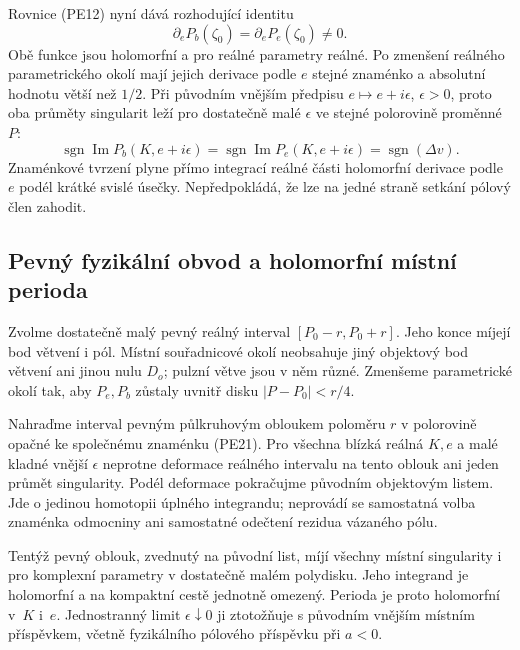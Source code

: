 \documentclass[11pt,a4paper]{article}
\theoremstyle{remark}\newtheorem{remark}[theorem]{Poznámka}
\numberwithin{equation}{section}
\begin{document}
Rovnice (PE12) nyní dává rozhodující identitu
\[
\boxed{
\partial_eP_b(\zeta_0)=\partial_eP_e(\zeta_0)\ne0.
}
\tag{PE20}
\]
Obě funkce jsou holomorfní a pro reálné parametry reálné.
Po zmenšení reálného parametrického okolí mají jejich derivace
podle \(e\) stejné znaménko a absolutní hodnotu větší než
\(1/2\). Při původním vnějším předpisu
\(e\mapsto e+i\epsilon\), \(\epsilon>0\), proto oba
průměty singularit leží pro dostatečně malé \(\epsilon\)
ve stejné polorovině proměnné \(P\):
\[
\operatorname{sgn}\operatorname{Im}P_b(K,e+i\epsilon)
=\operatorname{sgn}\operatorname{Im}P_e(K,e+i\epsilon)
=\operatorname{sgn}(\Delta v).
\tag{PE21}
\]
Znaménkové tvrzení plyne přímo integrací reálné části holomorfní
derivace podle \(e\) podél krátké svislé úsečky. Nepředpokládá,
že lze na jedné straně setkání pólový člen zahodit.

\subsection{Pevný fyzikální obvod a holomorfní místní perioda}

Zvolme dostatečně malý pevný reálný interval
\([P_0-r,P_0+r]\). Jeho konce míjejí bod větvení i pól.
Místní souřadnicové okolí neobsahuje jiný objektový bod větvení
ani jinou nulu \(D_o\); pulzní větve jsou v něm různé.
Zmenšeme parametrické okolí tak, aby \(P_e,P_b\) zůstaly
uvnitř disku \(|P-P_0|<r/4\).

Nahraďme interval pevným půlkruhovým obloukem poloměru \(r\)
v polorovině opačné ke společnému znaménku (PE21). Pro všechna
blízká reálná \(K,e\) a malé kladné vnější \(\epsilon\)
neprotne deformace reálného intervalu na tento oblouk ani jeden
průmět singularity. Podél deformace pokračujme původním objektovým
listem. Jde o jedinou homotopii úplného integrandu; neprovádí se
samostatná volba znaménka odmocniny ani samostatné odečtení
rezidua vázaného pólu.

Tentýž pevný oblouk, zvednutý na původní list, míjí všechny místní
singularity i pro komplexní parametry v dostatečně malém
polydisku. Jeho integrand je holomorfní a na kompaktní cestě
jednotně omezený. Perioda je proto holomorfní v~\(K\) i~\(e\).
Jednostranný limit \(\epsilon\downarrow0\) ji ztotožňuje
s původním vnějším místním příspěvkem, včetně fyzikálního
pólového příspěvku při \(a<0\).
\end{document}
